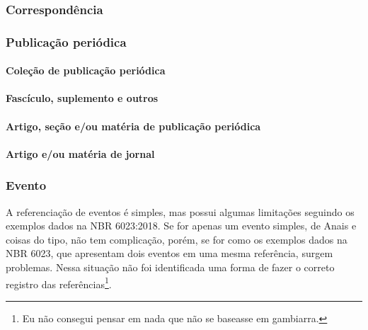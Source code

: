 

\subsubsection{Correspondência}

\subsubsection{Publicação periódica}
\paragraph{Coleção de publicação periódica}


\paragraph{Fascículo, suplemento e outros}


\paragraph{Artigo, seção e/ou matéria de publicação periódica}



\paragraph{Artigo e/ou matéria de jornal}{}


\subsubsection{Evento}
A referenciação de eventos é simples, mas possui algumas limitações seguindo os exemplos dados na NBR 6023:2018. Se for apenas um evento simples, de Anais e coisas do tipo, não tem complicação, porém, se for como os exemplos dados na NBR 6023, que apresentam dois eventos em uma mesma referência, surgem problemas. Nessa situação não foi identificada uma forma de fazer o correto registro das referências\footnote{Eu não consegui pensar em nada que não se baseasse em gambiarra.}.

